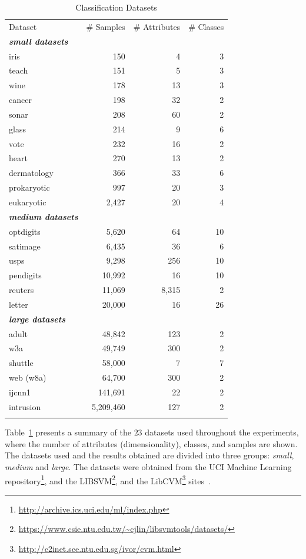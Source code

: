 \documentclass[reqno]{vcuthesis}
\numberwithin{equation}{chapter}
\begin{document}
\begin{table}[t!]
\caption{Classification Datasets}
\footnotesize
\centering
\label{tab:ollawvDataset}
\begin{tabularx}{0.7\textwidth}{l@{\extracolsep{\fill}}rrr}
\hline\noalign{\smallskip}
Dataset & \# Samples & \# Attributes & \# Classes \\
\noalign{\smallskip}\hline\noalign{\smallskip}
\textbf{\textit{small datasets}} & \\
iris & 150 & 4 &  3  \\ 
teach & 151 & 5 &  3  \\ 
wine & 178 & 13 &  3  \\ 
cancer & 198 & 32 &  2  \\ 
sonar & 208 & 60 &  2  \\ 
glass & 214 & 9 &  6  \\ 
vote & 232 & 16 &  2  \\ 
heart & 270 & 13 &  2  \\ 
dermatology & 366 & 33 &  6  \\ 
prokaryotic & 997 & 20 &  3  \\ 
eukaryotic & 2,427 & 20 &  4  \\ 
\textbf{\textit{medium datasets}} & \\
optdigits & 5,620 & 64 &  10  \\ 
satimage & 6,435 & 36 &  6  \\ 
usps & 9,298 & 256 &  10  \\ 
pendigits & 10,992 & 16 &  10  \\ 
reuters & 11,069 & 8,315 &  2  \\ 
letter & 20,000 & 16 &  26  \\ 
\textbf{\textit{large datasets}} & \\
adult & 48,842 & 123 &  2  \\ 
w3a & 49,749 & 300 &  2  \\ 
shuttle & 58,000 & 7 &  7  \\ 
web (w8a) & 64,700 & 300 &  2  \\ 
ijcnn1 & 141,691 & 22 &  2  \\ 
intrusion & 5,209,460 & 127 &  2  \\  
\noalign{\smallskip}\hline
\end{tabularx}
\end{table}

Table~\ref{tab:ollawvDataset} presents a summary of the $23$ datasets used throughout the experiments, where the number of attributes (dimensionality), classes, and samples are shown. The datasets used and the results obtained are divided into three groups: \textit{small}, \textit{medium} and \textit{large}. The datasets were obtained from the UCI Machine Learning repository\footnote{\url{http://archive.ics.uci.edu/ml/index.php}}, and the LIBSVM\footnote{\url{https://www.csie.ntu.edu.tw/~cjlin/libsvmtools/datasets/}}, and the LibCVM\footnote{\url{http://c2inet.sce.ntu.edu.sg/ivor/cvm.html}} sites~\cite{Lichman:2013,CC01a,tsang2005core}. 
\end{document}

